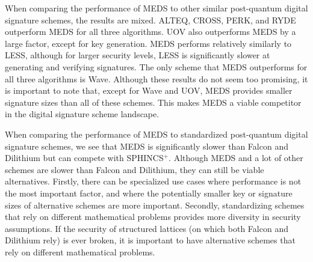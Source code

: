 \documentclass[11pt,a4paper]{report}
\theoremstyle{definition}
\begin{document}
When comparing the performance of MEDS to other similar post-quantum digital signature schemes, the results are mixed. ALTEQ, CROSS, PERK, and RYDE outperform MEDS for all three algorithms. UOV also outperforms MEDS by a large factor, except for key generation. MEDS performs relatively similarly to LESS, although for larger security levels, LESS is significantly slower at generating and verifying signatures. The only scheme that MEDS outperforms for all three algorithms is Wave. Although these results do not seem too promising, it is important to note that, except for Wave and UOV, MEDS provides smaller signature sizes than all of these schemes. This makes MEDS a viable competitor in the digital signature scheme landscape.

When comparing the performance of MEDS to standardized post-quantum digital signature schemes, we see that MEDS is significantly slower than Falcon and Dilithium but can compete with SPHINCS$^+$. Although MEDS and a lot of other schemes are slower than Falcon and Dilithium, they can still be viable alternatives. Firstly, there can be specialized use cases where performance is not the most important factor, and where the potentially smaller key or signature sizes of alternative schemes are more important. Secondly, standardizing schemes that rely on different mathematical problems provides more diversity in security assumptions. If the security of structured lattices (on which both Falcon and Dilithium rely) is ever broken, it is important to have alternative schemes that rely on different mathematical problems.

\pagebreak
\end{document}
